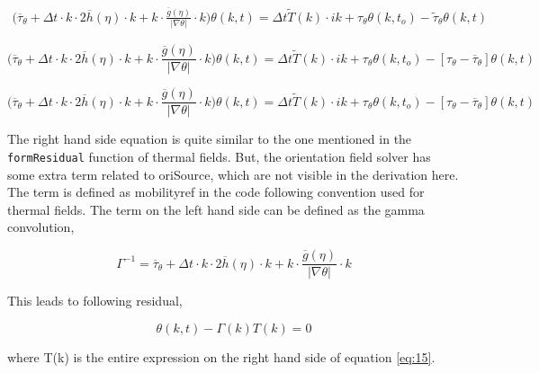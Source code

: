 \documentclass[a4paper,11pt,dvipsnames]{article}
\begin{document}
\begin{multline}
\biggl ( \overline{\tau}_\theta + \Delta t \cdot k \cdot 2 \overline{h} (\eta) \cdot k 
+ k \cdot \frac{\overline{g}(\eta)}{\left | \nabla \theta \right |} \cdot k \biggr ) \theta (k,t) = 
\Delta t \tilde{T}(k) \cdot ik + \tau_\theta \theta (k,t_o) - \tilde{\tau}_\theta \theta (k,t) \label{eq:16}
\end{multline}

\begin{equation}
\biggl ( \overline{\tau}_\theta + \Delta t \cdot k \cdot 2 \overline{h} (\eta) \cdot k 
+ k \cdot \frac{\overline{g}(\eta)}{\left | \nabla \theta \right |} \cdot k \biggr ) \theta (k,t) = 
\Delta t \tilde{T}(k) \cdot ik + \tau_\theta \theta (k,t_o) - 
\left [ \tau_\theta - \overline{\tau}_\theta \right ] \theta (k,t) \label{eq:17}
\end{equation}

\begin{equation}
\biggl ( \overline{\tau}_\theta + \Delta t \cdot k \cdot 2 \overline{h} (\eta) \cdot k 
+ k \cdot \frac{\overline{g}(\eta)}{\left | \nabla \theta \right |} \cdot k \biggr ) \theta (k,t) = 
\Delta t \tilde{T}(k) \cdot ik + \tau_\theta \theta (k,t_o) - 
\left [ \tau_\theta - \overline{\tau}_\theta \right ] \theta (k,t) \label{eq:18}
\end{equation}

The right hand side equation is quite similar to the one mentioned in the \verb|formResidual| function of thermal fields. 
But, the orientation field solver has some extra term related to oriSource, which are not visible in the derivation here. 
The term  is defined as mobility\textunderscore ref in the code following convention used 
for thermal fields. 
The term on the left hand side can be defined as the gamma convolution, 

\begin{equation}
    \Gamma^{-1} = \overline{\tau}_\theta + \Delta t \cdot k \cdot 2 \overline{h} (\eta) \cdot k 
    + k \cdot \frac{\overline{g}(\eta)}{\left | \nabla \theta \right |} \cdot k \label{eq:19}
\end{equation}

This leads to following residual, 

\begin{equation}
    \theta (k,t) - \Gamma (k) T(k) = 0 \label{eq:20}
\end{equation}

where T(k) is the entire expression on the right hand side of equation \ref{eq:15}. 
\end{document}

